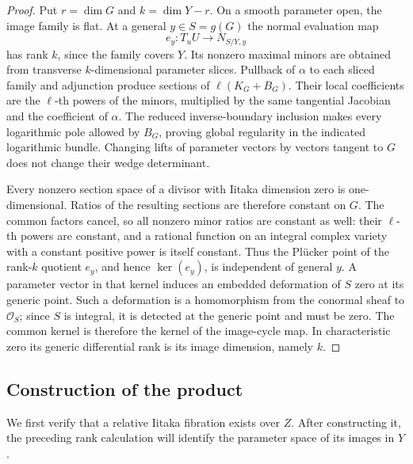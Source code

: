\begin{proof}
Put $r=\dim G$ and $k=\dim Y-r$.  On a smooth parameter open,
the image family is flat.  At a general $y\in S=g(G)$ the normal
evaluation map
\[
 e_y:T_uU\longrightarrow N_{S/Y,y}
\]
has rank $k$, since the family covers $Y$.  Its nonzero maximal
minors are obtained from transverse $k$-dimensional parameter slices.
Pullback of $\alpha$ to each sliced family and adjunction produce
sections of $\ell(K_G+B_G)$.  Their local coefficients are the
$\ell$-th powers of the minors, multiplied by the same tangential
Jacobian and the coefficient of $\alpha$. The reduced inverse-boundary
inclusion makes every logarithmic pole allowed by $B_G$, proving
global regularity in the indicated logarithmic bundle.
Changing lifts of parameter vectors
by vectors tangent to $G$ does not change their wedge determinant.

Every nonzero section space of a divisor with Iitaka dimension zero
is one-dimensional.  Ratios of the resulting sections are therefore
constant on $G$.  The common factors cancel, so all nonzero minor
ratios are constant as well: their $\ell$-th powers are constant,
and a rational function on an integral complex variety with a
constant positive power is itself constant.  Thus the Pl\"ucker point of the
rank-$k$ quotient $e_y$, and hence $\ker(e_y)$, is independent of
general $y$.  A parameter vector in that kernel induces an embedded
deformation of $S$ zero at its generic point.  Such a deformation is
a homomorphism from the conormal sheaf to $\mathcal O_S$; since $S$
is integral, it is detected at the generic point and must be zero.
The common kernel is therefore the kernel of the image-cycle map.
In characteristic zero its generic differential rank is its image
dimension, namely $k$.
\end{proof}

\subsection{Construction of the product}

We first verify that a relative Iitaka fibration exists over $Z$.
After constructing it, the preceding rank calculation will identify
the parameter space of its images in $Y$.

